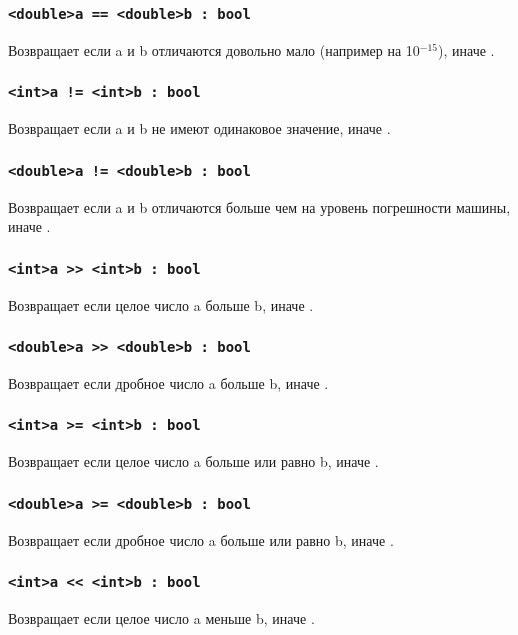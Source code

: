 \documentclass[a4paper, 14pt]{extarticle}
\begin{document}
\subsubsection{\lstinline`<double>a == <double>b : bool`}
	Возвращает  если a и b отличаются довольно мало (например на 10$^{-15}$), иначе .

\subsubsection{\lstinline`<int>a != <int>b : bool`}
	Возвращает  если a и b не имеют одинаковое значение, иначе .

\subsubsection{\lstinline`<double>a != <double>b : bool`}
	Возвращает  если a и b отличаются больше чем на уровень погрешности машины, иначе .

\subsubsection{\lstinline`<int>a >> <int>b : bool`}
	Возвращает  если целое число a больше b, иначе .

\subsubsection{\lstinline`<double>a >> <double>b : bool`}
	Возвращает  если дробное число a больше b, иначе .

\subsubsection{\lstinline`<int>a >= <int>b : bool`}
	Возвращает  если целое число a больше или равно b, иначе .

\subsubsection{\lstinline`<double>a >= <double>b : bool`}
	Возвращает  если дробное число a больше или равно b, иначе .

\subsubsection{\lstinline`<int>a << <int>b : bool`}
	Возвращает  если целое число a меньше b, иначе .
\end{document}
